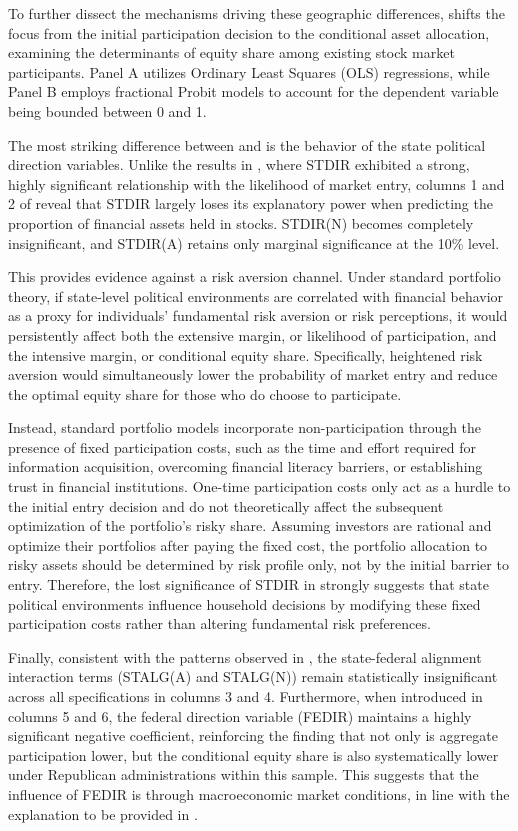 To further dissect the mechanisms driving these geographic differences,  shifts the focus from the initial participation decision to the conditional asset allocation, examining the determinants of equity share among existing stock market participants. Panel A utilizes Ordinary Least Squares (OLS) regressions, while Panel B employs fractional Probit models to account for the dependent variable being bounded between 0 and 1.

The most striking difference between  and  is the behavior of the state political direction variables. Unlike the results in , where STDIR exhibited a strong, highly significant relationship with the likelihood of market entry, columns 1 and 2 of  reveal that STDIR largely loses its explanatory power when predicting the proportion of financial assets held in stocks. STDIR(N) becomes completely insignificant, and STDIR(A) retains only marginal significance at the 10\% level.

This provides evidence against a risk aversion channel. Under standard portfolio theory, if state-level political environments are correlated with financial behavior as a proxy for individuals' fundamental risk aversion or risk perceptions, it would persistently affect both the extensive margin, or likelihood of participation, and the intensive margin, or conditional equity share. Specifically, heightened risk aversion would simultaneously lower the probability of market entry and reduce the optimal equity share for those who do choose to participate.

Instead, standard portfolio models incorporate non-participation through the presence of fixed participation costs, such as the time and effort required for information acquisition, overcoming financial literacy barriers, or establishing trust in financial institutions. One-time participation costs only act as a hurdle to the initial entry decision and do not theoretically affect the subsequent optimization of the portfolio's risky share. Assuming investors are rational and optimize their portfolios after paying the fixed cost, the portfolio allocation to risky assets should be determined by risk profile only, not by the initial barrier to entry. Therefore, the lost significance of STDIR in  strongly suggests that state political environments influence household decisions by modifying these fixed participation costs rather than altering fundamental risk preferences.

Finally, consistent with the patterns observed in , the state-federal alignment interaction terms (STALG(A) and STALG(N)) remain statistically insignificant across all specifications in columns 3 and 4. Furthermore, when introduced in columns 5 and 6, the federal direction variable (FEDIR) maintains a highly significant negative coefficient, reinforcing the finding that not only is aggregate participation lower, but the conditional equity share is also systematically lower under Republican administrations within this sample. This suggests that the influence of FEDIR is through macroeconomic market conditions, in line with the explanation to be provided in .


